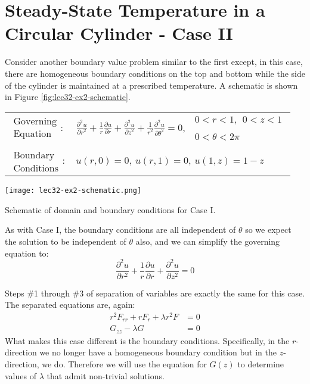 \section{Steady-State Temperature in a Circular Cylinder - Case II}
Consider another boundary value problem similar to the first except, in this case, there are homogeneous boundary conditions on the top and bottom while the side of the cylinder is maintained at a prescribed temperature.  A schematic is shown in Figure \ref{fig:lec32-ex2-schematic}.
\begin{table}[h]
\begin{tabular}{l l}
$\substack{\text{Governing} \\\text{Equation}}: $& $\frac{\partial^2 u}{\partial r^2} + \frac{1}{r}\frac{\partial u}{\partial r} + \frac{\partial^2 u}{\partial z^2} + \frac{1}{r^2}\frac{\partial^2 u}{\partial \theta^2}= 0, \ \ \substack{0<r<1, \ \ 0<z<1 \\ \\ 0<\theta<2 \pi}$\\
& \\
$\substack{\text{Boundary} \\ \text{Conditions}}: $ & $u(r,0) = 0, \ u(r,1) = 0, \ u(1,z) = 1-z$  \\ 
\end{tabular}
\end{table} 
\begin{marginfigure}
\texttt{[image: lec32-ex2-schematic.png]}
\caption{Schematic of domain and boundary conditions for Case I.}
\label{fig:lec32-ex2-schematic}
\end{marginfigure}
As with Case I, the boundary conditions are all independent of $\theta$ so we expect the solution to be independent of $\theta$ also, and we can simplify the governing equation to:
\begin{equation*}
\frac{\partial^2 u}{\partial r^2} + \frac{1}{r}\frac{\partial u}{\partial r} + \frac{\partial^2 u}{\partial z^2} = 0
\end{equation*}

\vspace{2.0cm}

 Steps \#1 through \#3 of separation of variables are exactly the same for this case.  The separated equations are, again:
\begin{align*}
r^2F_{rr} + rF_r + \lambda r^2 F &= 0 \\
G_{zz} - \lambda G &= 0
\end{align*}
What makes this case different is the boundary conditions.  Specifically, in the $r$-direction we no longer have a homogeneous boundary condition but in the $z$-direction, we do.  Therefore we will use the equation for $G(z)$ to determine values of $\lambda$ that admit non-trivial solutions.

